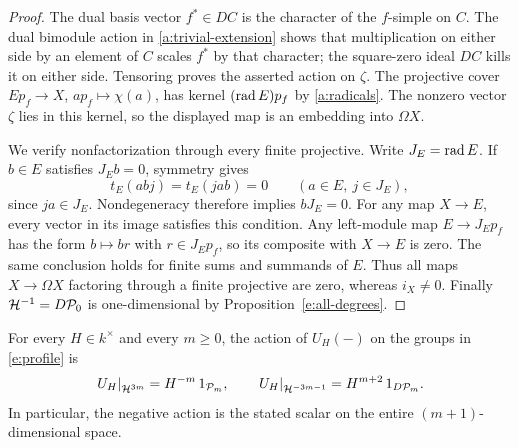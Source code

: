 \begin{proof}
The dual basis vector \(f^*\in DC\) is the character of the
\(f\)-simple on \(C\).  The dual bimodule action in
\eqref{a:trivial-extension} shows that multiplication on either side
by an element of \(C\) scales \(f^*\) by that character; the
square-zero ideal \(DC\) kills it on either side.  Tensoring proves
the asserted action on \(\zeta\).  The projective cover
\(Ep_f\to X\), \(ap_f\mapsto\chi(a)\), has kernel
\((\operatorname{rad} E)p_f\) by \eqref{a:radicals}.  The nonzero vector \(\zeta\)
lies in this kernel, so the displayed map is an embedding into
\(\Omega X\).

We verify nonfactorization through every finite projective.  Write
\(J_E=\operatorname{rad} E\).  If \(b\in E\) satisfies \(J_Eb=0\), symmetry gives
\[
t_E(abj)=t_E(jab)=0\qquad(a\in E,\ j\in J_E),
\]
since \(ja\in J_E\).  Nondegeneracy therefore implies \(bJ_E=0\).
For any map \(X\to E\), every vector in its image satisfies this
condition.  Any left-module map \(E\to J_Ep_f\) has the form
\(b\mapsto br\) with \(r\in J_Ep_f\), so its composite with
\(X\to E\) is zero.  The same conclusion holds for finite sums and
summands of \(E\).  Thus all maps \(X\to\Omega X\) factoring
through a finite projective are zero, whereas \(i_X\ne0\).
Finally \(\mathcal H^{-1}=D\mathcal P_0\) is one-dimensional by
Proposition~\ref{e:all-degrees}.
\end{proof}

\begin{proposition}\label{e:twists}
For every \(H\in k^\times\) and every \(m\ge0\), the action of
\(U_H(-)\) on the groups in \eqref{e:profile} is
\begin{equation}
\left.U_H\right|_{\mathcal H^{3m}}=H^{-m}\,1_{\mathcal P_m},
\qquad
\left.U_H\right|_{\mathcal H^{-3m-1}}=H^{m+2}\,1_{D\mathcal P_m}.
\label{e:twist-weights}
\end{equation}
In particular, the negative action is the stated scalar on the entire
\((m+1)\)-dimensional space.
\end{proposition}

